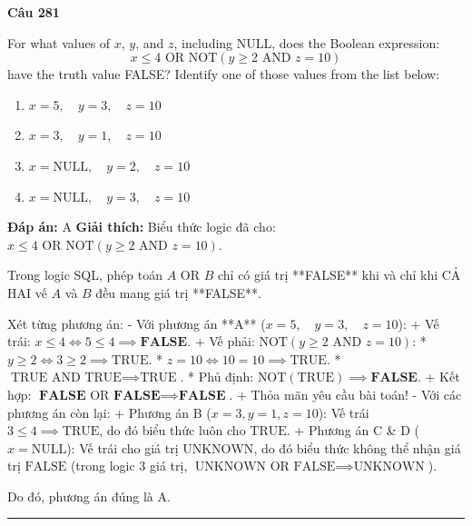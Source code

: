 \documentclass[11pt,a4paper]{article}
\newenvironment{question}[1]{%
  \par\vspace{1em}\noindent\textbf{\large Câu #1}\par\vspace{0.4em}
}{%
  \par\vspace{1em}\hrule\vspace{0.6em}
}
\newenvironment{choices}{%
  \begin{enumerate}[label=\textbf{\Alph*.},leftmargin=2.2em,itemsep=2pt,topsep=3pt]
}{%
  \end{enumerate}
}
\newcommand{\choice}{\item}
\begin{document}
\begin{question}{281}
For what values of \(x\), \(y\), and \(z\), including NULL, does the Boolean expression:
\[x \le 4 \text{ OR NOT}(y \ge 2 \text{ AND } z = 10)\]
have the truth value FALSE? Identify one of those values from the list below:
\begin{choices}
\choice \(x = 5, \quad y = 3, \quad z = 10\)
\choice \(x = 3, \quad y = 1, \quad z = 10\)
\choice \(x = \text{NULL}, \quad y = 2, \quad z = 10\)
\choice \(x = \text{NULL}, \quad y = 3, \quad z = 10\)
\end{choices}
\textbf{Đáp án:} A
\textbf{Giải thích:} Biểu thức logic đã cho: \(x \le 4 \text{ OR NOT}(y \ge 2 \text{ AND } z = 10)\).

Trong logic SQL, phép toán \(A \text{ OR } B\) chỉ có giá trị **FALSE** khi và chỉ khi CẢ HAI vế \(A\) và \(B\) đều mang giá trị **FALSE**.

Xét từng phương án:
- Với phương án **A** (\(x = 5, \quad y = 3, \quad z = 10\)):
  + Vế trái: \(x \le 4 \iff 5 \le 4 \implies \textbf{FALSE}\).
  + Vế phải: \(\text{NOT}(y \ge 2 \text{ AND } z = 10)\):
    * \(y \ge 2 \iff 3 \ge 2 \implies \text{TRUE}\).
    * \(z = 10 \iff 10 = 10 \implies \text{TRUE}\).
    * \(\text{TRUE AND TRUE} \implies \text{TRUE}\).
    * Phủ định: \(\text{NOT}(\text{TRUE}) \implies \textbf{FALSE}\).
  + Kết hợp: \(\textbf{FALSE} \text{ OR } \textbf{FALSE} \implies \textbf{FALSE}\).
  + Thỏa mãn yêu cầu bài toán!
- Với các phương án còn lại:
  + Phương án B (\(x = 3, y = 1, z = 10\)): Vế trái \(3 \le 4 \implies \text{TRUE}\), do đó biểu thức luôn cho \(\text{TRUE}\).
  + Phương án C & D (\(x = \text{NULL}\)): Vế trái cho giá trị \(\text{UNKNOWN}\), do đó biểu thức không thể nhận giá trị \(\text{FALSE}\) (trong logic 3 giá trị, \(\text{UNKNOWN OR FALSE} \implies \text{UNKNOWN}\)).

Do đó, phương án đúng là A.
\end{question}
\end{document}
